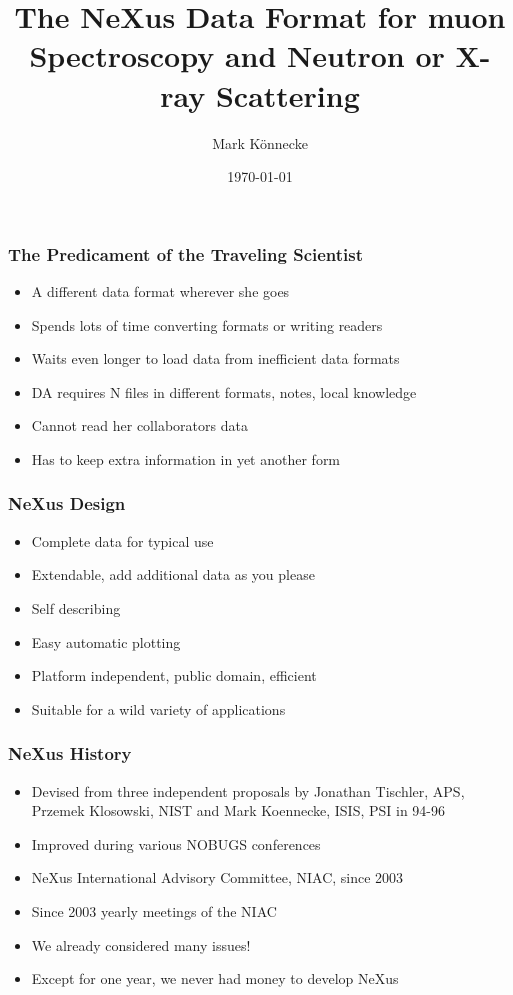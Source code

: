 \documentclass{beamer}
\title{The NeXus Data Format for muon Spectroscopy and Neutron or X-ray Scattering }
\author{Mark K\"onnecke }
\institute{Paul Scherrer Institute\\Switzerland }
\date{\today}
\begin{document}
\begin{frame}
\titlepage
\end{frame}

\begin{frame}
\frametitle{The Predicament of the Traveling Scientist}
\begin{itemize}
\item<1->A different data format wherever she goes
\item<2->Spends lots of time converting formats or writing readers
\item<3->Waits even longer to load data from inefficient data formats
\item<4->DA requires N files in different  formats, notes, local knowledge 
\item<5->Cannot read her collaborators data
\item<6->Has to keep extra information in yet another form
\end{itemize}
\end{frame}

\begin{frame} \frametitle{NeXus Design}
\begin{itemize}
\item Complete data for typical use
\item Extendable, add additional data as you please
\item Self describing
\item Easy automatic plotting
\item Platform independent, public domain, efficient
\item Suitable for a wild variety of applications
\end{itemize}
\end{frame}

\begin{frame} \frametitle{NeXus History }
\begin{itemize}
\item Devised from three independent proposals by Jonathan Tischler, 
  APS, Przemek Klosowski, NIST and 
 Mark Koennecke, ISIS, PSI in 94-96
\item Improved during various NOBUGS conferences
\item NeXus International Advisory Committee, NIAC, since 2003
\item Since 2003 yearly meetings of the NIAC
\item We already considered many issues!
\item Except for one year, we never had money to develop NeXus
\end{itemize}
\end{frame}
\end{document}
